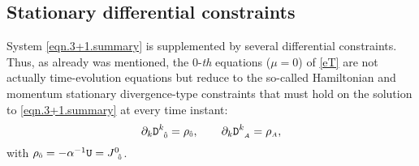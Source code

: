 \documentclass[
10pt, %
a4paper, %
oneside, %
twocolumn,
headinclude,footinclude, %
BCOR5mm, %
]{scrartcl}
\newcommand{\sA}{\mathsmaller A}
\newcommand{\sB}{\mathsmaller B}
\newcommand{\sC}{\mathsmaller C}
\newcommand{\sD}{\mathsmaller D}
\newcommand{\sE}{\mathsmaller E}
\newcommand{\pd}[1]{\partial_{#1}}
\newcommand{\mg}[1]{\kappa_{#1}}			%
\newcommand{\tetrsymbol}{h}
\newcommand{\itetrsymbol}{\eta}
\newcommand{\itetr}[2]{\itetrsymbol^{#1}_{\phantom{#1}#2}}
\newcommand{\tetr}[2]{\tetrsymbol^{#1}_{\phantom{#1}#2}}
\newcommand{\detTetr}{\tetrsymbol}
\newcommand{\Dfin}[2]{\mathtt{D}_{\phantom{#2}#1}^{#2}}	%
\newcommand{\Efin}[2]{\mathtt{E}^{#1}_{\phantom{#1}#2}}	%
\newcommand{\Ufin}{\mathtt{U}}
\newcommand{\Bfin}[2]{\mathtt{B}^{#1#2}}	%
\newcommand{\LCsymb}{\bm{\in}}    %
\newcommand{\NC}[2]{J^{#2}_{\phantom{#2}#1}}
\newcommand{\indalg}[1]{\hat{\mathsmaller{#1}}}
\newcommand{\shift}[1]{\beta^{#1}}
\begin{document}
	
	
	
	\subsection{Stationary differential constraints}
	
	System \eqref{eqn.3+1.summary} is supplemented by several differential constraints. Thus, as 
	already was mentioned, the $ 0 $-\textit{th} equations ($ \mu=0 $) of \eqref{eT} are not 
	actually 
	time-evolution equations 
	but 
	reduce to the so-called Hamiltonian and momentum stationary divergence-type constraints that 
	must 
	hold on the 
	solution to \eqref{eqn.3+1.summary} at every time instant:
	\begin{equation}\label{eqn.div.constrD}
		\pd{k} \Dfin{\indalg{0}}{k} = \rho_{\indalg{0}},
		\qquad
		\pd{k} \Dfin{\sA}{k} = \rho_{\sA}, 
	\end{equation}
	with $ \rho_{\indalg{0}} = -\alpha^{-1} \Ufin = \NC{\indalg{0}}{0} $.
	
\end{document}

